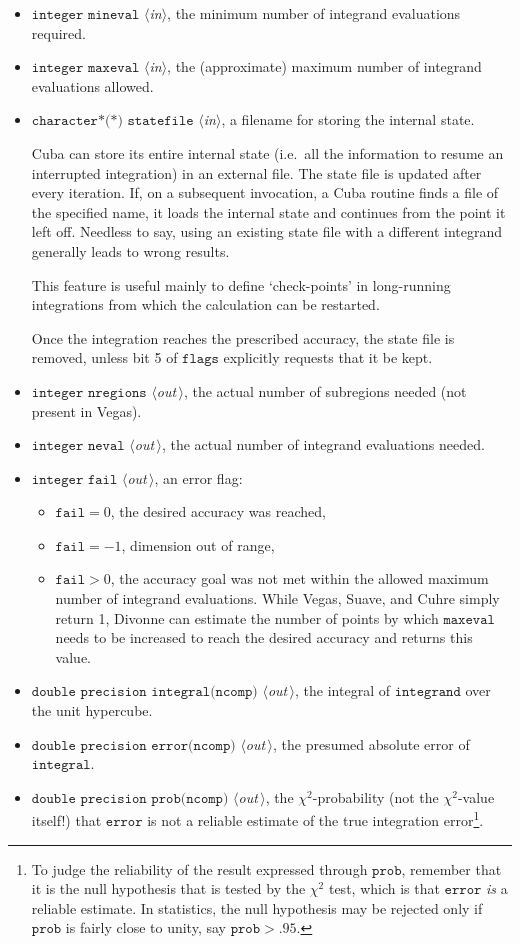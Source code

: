 \documentclass[12pt]{article}
\newcommand\ie{i.e.\ }
\newcommand\Code[1]{\ensuremath{\texttt{#1}}}
\newcommand\VarIn[1]{\item\Code{#1} \textit{$\langle$in\/$\rangle$},}
\newcommand\VarOut[1]{\item\Code{#1} \textit{$\langle$out\,$\rangle$},}
\begin{document}
\begin{itemize}
\VarIn{integer mineval}
the minimum number of integrand evaluations required.

\VarIn{integer maxeval}
the (approximate) maximum number of integrand evaluations allowed.

\VarIn{character*(*) statefile}
a filename for storing the internal state.

Cuba can store its entire internal state (\ie all the information to 
resume an interrupted integration) in an external file.  The state file 
is updated after every iteration.  If, on a subsequent invocation, a
Cuba routine finds a file of the specified name, it loads the internal
state and continues from the point it left off.  Needless to say, using
an existing state file with a different integrand generally leads to
wrong results.

This feature is useful mainly to define `check-points' in long-running 
integrations from which the calculation can be restarted.

Once the integration reaches the prescribed accuracy, the state file
is removed, unless bit 5 of \Code{flags} explicitly requests that it
be kept.

\VarOut{integer nregions}
the actual number of subregions needed (not present in Vegas).

\VarOut{integer neval}
the actual number of integrand evaluations needed.

\VarOut{integer fail}
an error flag:
\begin{itemize}
\item
$\Code{fail} = 0$, the desired accuracy was reached,
\item
$\Code{fail} = -1$, dimension out of range,
\item
$\Code{fail} > 0$, the accuracy goal was not met within the allowed
maximum number of integrand evaluations.  While Vegas, Suave, and Cuhre
simply return 1, Divonne can estimate the number of points by which
\Code{maxeval} needs to be increased to reach the desired accuracy and
returns this value.
\end{itemize}

\VarOut{double precision integral(ncomp)}
the integral of \Code{integrand} over the unit hypercube.

\VarOut{double precision error(ncomp)}
the presumed absolute error of \Code{integral}.

\VarOut{double precision prob(ncomp)}
the $\chi^2$-probability (not the $\chi^2$-value itself!) that
\Code{error} is not a reliable estimate of the true integration 
error\footnote{%
	To judge the reliability of the result expressed through
	\Code{prob}, remember that it is the null hypothesis that is 
	tested by the $\chi^2$ test, which is that \Code{error} 
	\emph{is} a reliable estimate.  In statistics, the null 
	hypothesis may be rejected only if \Code{prob} is fairly close 
	to unity, say $\Code{prob} > .95$.}.
\end{itemize}
\end{document}
